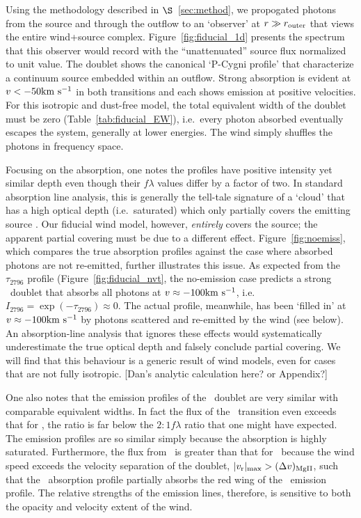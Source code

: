 \documentclass[12pt,preprint]{aastex}
\begin{document}
Using the methodology described in $\S$~\ref{sec:method}, we
propogated photons from the source and through the outflow to an
`observer' at $r \gg r_{\rm outer}$ that views the entire wind+source
complex.  Figure~\ref{fig:fiducial_1d} presents the spectrum
that this observer would record with the ``unattenuated'' source flux
normalized to unit value.   The  doublet
shows the canonical `P-Cygni profile' that characterize a continuum
source embedded within an outflow.  Strong absorption is evident at
$v < -50 {\rm km~s^{-1}}$ in both transitions and each shows emission at
positive velocities.  For this isotropic and dust-free model, the
total equivalent width of the doublet must be zero
(Table~\ref{tab:fiducial_EW}), i.e.\ every photon
absorbed eventually escapes the system, generally at lower
energies.  The wind simply shuffles the photons in frequency space.

Focusing on the  absorption, one notes the profiles have
positive intensity yet similar depth even though their $f\lambda$
values differ by a factor of two.  In standard absorption line
analysis, this is generally 
the tell-tale signature of a `cloud' that has a high optical depth (i.e.\
saturated) which only partially covers the emitting source
\citep[e.g.][]{hamman10}.  Our fiducial wind model, however, 
{\it entirely} covers the source; the apparent partial covering must
be due to a different effect.
Figure~\ref{fig:noemiss}, which compares the true
absorption profiles against the case where absorbed photons are not
re-emitted, further illustrates this issue.   As expected from the
$\tau_{2796}$ profile (Figure~\ref{fig:fiducial_nvt}, the no-emission
case predicts a strong \mgiid\ doublet that absorbs all photons at
$v \approx -100 {\rm km~s^{-1}}$, i.e.\ $I_{2796} = \exp(-\tau_{2796}) \approx 0$.
The actual profile, meanwhile, has been `filled in' at $v \approx -100
{\rm km~s^{-1}}$ by photons scattered and re-emitted by the wind (see below).  An
absorption-line analysis that ignores these effects
\citep[e.g.][]{sato} would systematically underestimate the true optical
depth and falsely conclude partial covering.  We will find that this
behaviour is a generic result of wind models, even for cases that are
not fully isotropic.
[Dan's analytic calculation here? or Appendix?]

One also notes that the emission profiles of the \mgiid\ doublet
are very similar with comparable equivalent widths.  In fact the
flux of the \mgiib\ transition even exceeds that for \mgiia, the ratio
is far below the $2:1 f\lambda$ ratio that one might have expected. The
emission profiles are so similar simply because the absorption is
highly saturated.
Furthermore, the flux from \mgiib\ is greater than that for
\mgiia\ because the wind speed exceeds the velocity separation
of the doublet, $|v_{\rm r}|_{\rm max} > (\Delta v)_{\rm MgII}$, such
that the \mgiib\ absorption profile partially absorbs the red wing of the
\mgiia\ emission profile.  The relative strengths of the emission
lines, therefore, is sensitive to both the opacity and velocity
extent of the wind.
\end{document}
